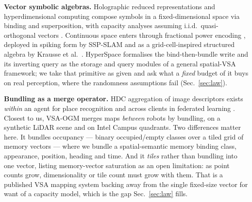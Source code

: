 \documentclass[conference]{IEEEtran}
\begin{document}
\textbf{Vector symbolic algebras.} Holographic reduced representations
\cite{plate1995holographic} and hyperdimensional computing
\cite{kanerva2009hyperdimensional,kleyko2022survey} compose symbols in a
fixed-dimensional space via binding and superposition, with capacity
analyses assuming i.i.d.\ quasi-orthogonal vectors \cite{frady2018theory}.
Continuous space enters through fractional power encoding
\cite{komer2019neural,voelker2021simulating}, deployed in spiking form by
SSP-SLAM \cite{dumont2023sspslam} and as a grid-cell-inspired structured
algebra by Krausse et al.\ \cite{krausse2025gcvsa}. HyperSpace
\cite{snyder2026hyperspace} formalises the bind-then-bundle write and its
inverting query as the storage and query modules of a general spatial-VSA
framework; we take that primitive as given and ask what a \emph{fixed}
budget of it buys on real perception, where the randomness assumptions
fail (Sec.~\ref{sec:law}).

\textbf{Bundling as a merge operator.} HDC aggregation of image
descriptors exists \emph{within} an agent for place recognition
\cite{neubert2021hyperdimensional} and across clients in federated
learning \cite{fedhd2022}. Closest to us, VSA-OGM \cite{snyder2026vsaogm}
merges maps \emph{between} robots by bundling, on a synthetic LiDAR scene
and on Intel Campus quadrants. Two differences matter here. It bundles
occupancy --- binary occupied/empty classes over a tiled grid of memory
vectors --- where we bundle a spatial-semantic memory binding class,
appearance, position, heading and time. And it \emph{tiles} rather than
bundling into one vector, listing memory-vector saturation as an open
limitation: as point counts grow, dimensionality or tile count must grow
with them. That is a published VSA mapping system backing away from the
single fixed-size vector for want of a capacity model, which is the gap
Sec.~\ref{sec:law} fills.
\end{document}
